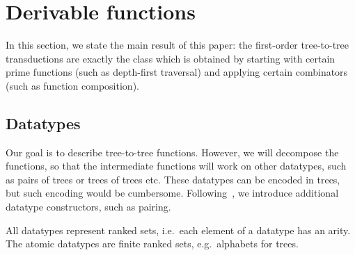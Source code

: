 \section{Derivable functions}
In this section, we state the main result of this paper: the  first-order tree-to-tree transductions are exactly the class which is obtained by starting with certain prime functions (such as depth-first traversal) and applying certain  combinators (such as function composition). 

\subsection{Datatypes}
\label{sec:datatype-constructors}
 Our goal is to describe tree-to-tree functions. However, we will decompose the functions, so that the   intermediate functions will work on other datatypes, such as pairs of trees or trees of trees etc. These datatypes  can be encoded in trees, but such encoding would be cumbersome. Following~\cite{bojanczykRegularFirstOrderList2018}, we  introduce additional  datatype constructors, such as pairing.

All datatypes represent ranked sets, i.e.~each element of a datatype has an arity. The atomic datatypes are finite ranked sets, e.g.~alphabets for trees. 

